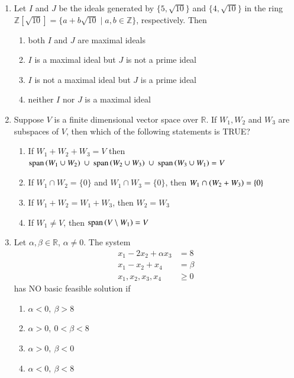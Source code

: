 \documentclass[journal,12pt,onecolumn]{IEEEtran}
\theoremstyle{remark}
\begin{document}
\begin{enumerate}[start=1, label=Q.\arabic*]
\hfill{}

\item Let $I$ and $J$ be the ideals generated by $\{5,\sqrt{10}\}$ and $\{4,\sqrt{10}\}$ in the ring $\mathbb{Z}[\sqrt{10}] = \{a + b\sqrt{10} \mid a,b \in \mathbb{Z}\}$, respectively. Then
\begin{enumerate}
\item both $I$ and $J$ are maximal ideals
\item $I$ is a maximal ideal but $J$ is not a prime ideal
\item $I$ is not a maximal ideal but $J$ is a prime ideal
\item neither $I$ nor $J$ is a maximal ideal
\end{enumerate}

\hfill{}


\item Suppose $V$ is a finite dimensional vector space over $\mathbb{R}$. If $W_1,W_2$ and $W_3$ are subspaces of $V$, then which of the following statements is TRUE?
\begin{enumerate}
\item If $W_1+W_2+W_3=V$ then $\text{span}\brak{W_1\cup W_2}\ \cup\ \text{span}\brak{W_2\cup W_3}\ \cup\ \text{span}\brak{W_3\cup W_1}=V$
\item If $W_1\cap W_2=\{0\}$ and $W_1\cap W_3=\{0\}$, then $W_1\cap \left(W_2+W_3\right)=\{0\}$
\item If $W_1+W_2=W_1+W_3$, then $W_2=W_3$
\item If $W_1\ne V$, then $\text{span}\left(V\setminus W_1\right)=V$
\end{enumerate}

\hfill{}


\item Let $\alpha,\beta \in \mathbb{R}$, $\alpha \ne 0$. The system
\begin{align*}
x_1-2x_2+\alpha x_3 &= 8\\
x_1-x_2+x_4 &= \beta\\
x_1,x_2,x_3,x_4 &\ge 0
\end{align*}
has NO basic feasible solution if
\begin{enumerate}
\item $\alpha<0,\ \beta>8$
\item $\alpha>0,\ 0<\beta<8$
\item $\alpha>0,\ \beta<0$
\item $\alpha<0,\ \beta<8$
\end{enumerate}


\end{enumerate}
\end{document}
